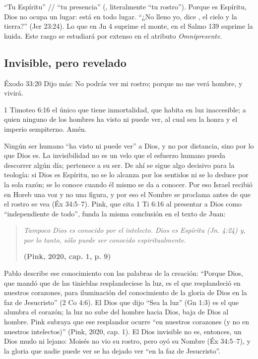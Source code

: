 ``Tu Espíritu'' // ``tu presencia'' (, literalmente ``tu rostro''). Porque es Espíritu, Dios no ocupa un lugar: está en todo lugar. ``¿No lleno yo, dice \SENOR, el cielo y la tierra?'' (Jer 23:24). Lo que en Jn 4 suprime el monte, en el Salmo 139 suprime la huida. Este rasgo se estudiará por extenso en el atributo \emph{Omnipresente}.

\subsection{Invisible, pero revelado}

\begin{verso}{Éxodo 33:20}
Dijo más: No podrás ver mi rostro; porque no me verá hombre, y vivirá.
\end{verso}

\begin{verso}{1 Timoteo 6:16}
el único que tiene inmortalidad, que habita en luz inaccesible; a quien ninguno de los hombres ha visto ni puede ver, al cual sea la honra y el imperio sempiterno. Amén.
\end{verso}

Ningún ser humano ``ha visto ni puede ver'' a Dios, y no por distancia, sino por lo que Dios es. La invisibilidad no es un velo que el esfuerzo humano pueda descorrer algún día; pertenece a su ser. De ahí se sigue algo decisivo para la teología: si Dios es Espíritu, no se lo alcanza por los sentidos ni se lo deduce por la sola razón; se lo conoce cuando él mismo se da a conocer. Por eso Israel recibió en Horeb una voz y no una figura, y por eso el Nombre se proclama antes de que el rostro se vea (Éx 34:5--7). Pink, que cita 1 Ti 6:16 al presentar a Dios como ``independiente de todo'', funda la misma conclusión en el texto de Juan:

\begin{quote}\itshape
Tampoco Dios es conocido por el intelecto. Dios es Espíritu (Jn. 4:24) y, por lo tanto, sólo puede ser conocido espiritualmente.\par\hfill{\upshape\small\bfseries\textcolor{azul}{(Pink, 2020, cap. 1, p. 9)}}
\end{quote}

Pablo describe ese conocimiento con las palabras de la creación: ``Porque Dios, que mandó que de las tinieblas resplandeciese la luz, es el que resplandeció en nuestros corazones, para iluminación del conocimiento de la gloria de Dios en la faz de Jesucristo'' (2 Co 4:6). El Dios que dijo ``Sea la luz'' (Gn 1:3) es el que alumbra el corazón; la luz no sube del hombre hacia Dios, baja de Dios al hombre. Pink subraya que ese resplandor ocurre ``en nuestros corazones (y no en nuestros intelectos)'' (Pink, 2020, cap. 1). El Dios invisible no es, entonces, un Dios mudo ni lejano: Moisés no vio su rostro, pero oyó su Nombre (Éx 34:5--7), y la gloria que nadie puede ver se ha dejado ver ``en la faz de Jesucristo''.

